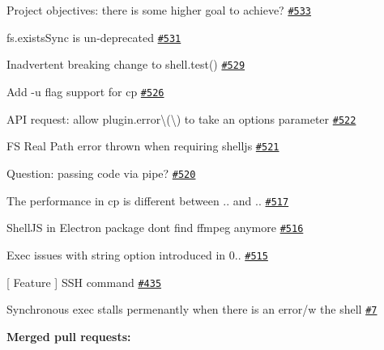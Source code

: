 \begin{DoxyItemize}
\item Project objectives\+: there is some higher goal to achieve? \href{https://github.com/shelljs/shelljs/issues/533}{\tt \#533}
\item fs.\+exists\+Sync is un-\/deprecated \href{https://github.com/shelljs/shelljs/issues/531}{\tt \#531}
\item Inadvertent breaking change to shell.\+test() \href{https://github.com/shelljs/shelljs/issues/529}{\tt \#529}
\item Add -\/u flag support for cp \href{https://github.com/shelljs/shelljs/issues/526}{\tt \#526}
\item A\+PI request\+: allow {\ttfamily plugin.\+error\textbackslash{}(\textbackslash{})} to take an options parameter \href{https://github.com/shelljs/shelljs/issues/522}{\tt \#522}
\item FS Real Path error thrown when requiring shelljs \href{https://github.com/shelljs/shelljs/issues/521}{\tt \#521}
\item Question\+: passing code via pipe? \href{https://github.com/shelljs/shelljs/issues/520}{\tt \#520}
\item The performance in {\ttfamily cp} is different between {..} and {..} \href{https://github.com/shelljs/shelljs/issues/517}{\tt \#517}
\item Shell\+JS in Electron package don\textquotesingle{}t find ffmpeg anymore \href{https://github.com/shelljs/shelljs/issues/516}{\tt \#516}
\item Exec issues with string option introduced in 0.. \href{https://github.com/shelljs/shelljs/issues/515}{\tt \#515}
\item \mbox{[} Feature \mbox{]} S\+SH command \href{https://github.com/shelljs/shelljs/issues/435}{\tt \#435}
\item Synchronous exec stalls permenantly when there is an error/w the shell \href{https://github.com/shelljs/shelljs/issues/7}{\tt \#7}
\end{DoxyItemize}

{\bfseries Merged pull requests\+:}


